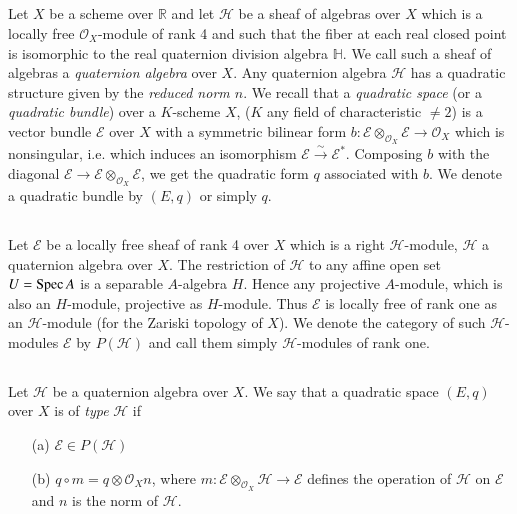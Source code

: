 \subsection{}\label{chap9-sec1.1}

Let $X$ be a scheme over $\mathbb{R}$ and let $\mathscr{H}$ be a sheaf
of algebras over $X$ which is a locally free $\mathscr{O}_{X}$-module
of rank 4 and such that the fiber at each real closed point is
isomorphic to the real quaternion division algebra $\mathbb{H}$. We
call such a sheaf of algebras a {\em quaternion algebra} over $X$. Any
quaternion algebra $\mathscr{H}$ has a quadratic structure given by
the {\em reduced norm $n$}. We recall that a {\em quadratic space} (or
a {\em quadratic bundle}) over a $K$-scheme $X$, ($K$ any field of
characteristic $\neq 2$) is a vector bundle $\mathscr{E}$ over $X$
with a symmetric bilinear form
$b:\mathscr{E}\otimes_{\mathscr{O}_{X}}\mathscr{E}\to \mathscr{O}_{X}$
which is nonsingular, i.e. which induces an isomorphism
$\mathscr{E}\xrightarrow{\sim}\mathscr{E}^{*}$. Composing $b$ with the
diagonal
$\mathscr{E}\to \mathscr{E}\otimes_{\mathscr{O}_{X}}\mathscr{E}$, we
get the quadratic form $q$ associated with $b$. We denote a quadratic
bundle by $(E,q)$ or simply $q$.

\subsection{}\label{chap9-sec1.2}

Let $\mathscr{E}$ be a locally free sheaf of rank 4 over $X$ which is
a right $\mathscr{H}$-module, $\mathscr{H}$ a quaternion algebra over
$X$. The restriction of $\mathscr{H}$ to any affine open set $U=\operatorname{Spec}
A$ is a separable $A$-algebra $H$. Hence any projective $A$-module,
which is also an $H$-module, projective as $H$-module. Thus
$\mathscr{E}$ is locally free of rank one as an
$\mathscr{H}$-module\pageoriginale 
(for the Zariski topology of $X$). We denote the category of such
$\mathscr{H}$-modules $\mathscr{E}$ by $P(\mathscr{H})$ and call them
simply $\mathscr{H}$-modules of rank one.

\subsection{}\label{chap9-sec1.3}

Let $\mathscr{H}$ be a quaternion algebra over $X$. We say that a
quadratic space $(E,q)$ over $X$ is of {\em type} $\mathscr{H}$ if
\begin{itemize}
\item[(a)] $\mathscr{E}\in P(\mathscr{H})$

\item[(b)] $q\circ m=q\otimes \mathscr{O}_{X}n$, where
$m:\mathscr{E}\otimes_{\mathscr{O}_{X}}\mathscr{H}\to \mathscr{E}$
defines the operation of $\mathscr{H}$ on $\mathscr{E}$ and $n$ is the
norm of $\mathscr{H}$. 
\end{itemize}

